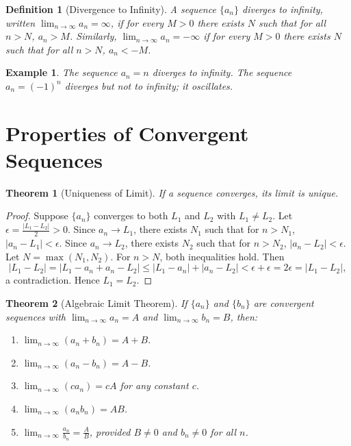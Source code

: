 \documentclass[11pt,a4paper]{article}
\newtheorem{example}{Example}
\newtheorem{theorem}{Theorem}
\newtheorem{definition}{Definition}
\begin{document}
\begin{definition}[Divergence to Infinity]
A sequence $\{a_n\}$ \textit{diverges to infinity}, written $\lim_{n \to \infty} a_n = \infty$, if for every $M > 0$ there exists $N$ such that for all $n > N$, $a_n > M$. Similarly, $\lim_{n \to \infty} a_n = -\infty$ if for every $M > 0$ there exists $N$ such that for all $n > N$, $a_n < -M$.
\end{definition}
\begin{example}
The sequence $a_n = n$ diverges to infinity. The sequence $a_n = (-1)^n$ diverges but not to infinity; it oscillates.
\end{example}
\section{Properties of Convergent Sequences}
\begin{theorem}[Uniqueness of Limit]
If a sequence converges, its limit is unique.
\end{theorem}
\begin{proof}
Suppose $\{a_n\}$ converges to both $L_1$ and $L_2$ with $L_1 \neq L_2$. Let $\epsilon = \frac{|L_1 - L_2|}{2} > 0$. Since $a_n \to L_1$, there exists $N_1$ such that for $n > N_1$, $|a_n - L_1| < \epsilon$. Since $a_n \to L_2$, there exists $N_2$ such that for $n > N_2$, $|a_n - L_2| < \epsilon$. Let $N = \max(N_1, N_2)$. For $n > N$, both inequalities hold. Then
\[
|L_1 - L_2| = |L_1 - a_n + a_n - L_2| \leq |L_1 - a_n| + |a_n - L_2| < \epsilon + \epsilon = 2\epsilon = |L_1 - L_2|,
\]
a contradiction. Hence $L_1 = L_2$.
\end{proof}
\begin{theorem}[Algebraic Limit Theorem]
If $\{a_n\}$ and $\{b_n\}$ are convergent sequences with $\lim_{n \to \infty} a_n = A$ and $\lim_{n \to \infty} b_n = B$, then:
\begin{enumerate}
\item $\lim_{n \to \infty} (a_n + b_n) = A + B$.
\item $\lim_{n \to \infty} (a_n - b_n) = A - B$.
\item $\lim_{n \to \infty} (c a_n) = c A$ for any constant $c$.
\item $\lim_{n \to \infty} (a_n b_n) = A B$.
\item $\displaystyle \lim_{n \to \infty} \frac{a_n}{b_n} = \frac{A}{B}$, provided $B \neq 0$ and $b_n \neq 0$ for all $n$.
\end{enumerate}
\end{theorem}
\end{document}
